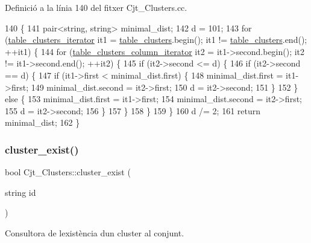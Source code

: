 Definició a la línia 140 del fitxer Cjt\+\_\+\+Clusters.\+cc.


\begin{DoxyCode}
140                                                 \{
141     pair<string, string> minimal\_dist;
142     d = 101;
143     \textcolor{keywordflow}{for} (\hyperlink{class_cjt___clusters_ac53ace59de6ecf75f90d7a4fc6e56c0e}{table\_clusters\_iterator} it1 = \hyperlink{class_cjt___clusters_a6af3fcf70683cdb88f137f6f51002939}{table\_clusters}.begin(); it1 != 
      \hyperlink{class_cjt___clusters_a6af3fcf70683cdb88f137f6f51002939}{table\_clusters}.end(); ++it1) \{
144         \textcolor{keywordflow}{for} (\hyperlink{class_cjt___clusters_abdef6142bd4683a878bb393a9095555e}{table\_clusters\_column\_iterator} it2 = it1->second.begin(); it2 !=
       it1->second.end(); ++it2) \{
145             \textcolor{keywordflow}{if} (it2->second <= d) \{
146                 \textcolor{keywordflow}{if} (it2->second == d) \{
147                     \textcolor{keywordflow}{if} (it1->first < minimal\_dist.first) \{
148                         minimal\_dist.first = it1->first;
149                         minimal\_dist.second = it2->first;
150                         d = it2->second;
151                     \}
152                 \} \textcolor{keywordflow}{else} \{
153                     minimal\_dist.first = it1->first;
154                     minimal\_dist.second = it2->first;
155                     d = it2->second;
156                 \}
157             \}              
158         \}
159     \}
160     d /= 2;
161     \textcolor{keywordflow}{return} minimal\_dist;
162 \}
\end{DoxyCode}
\mbox{\label{class_cjt___clusters_aaa57cbd8d86567b4403ac9adb34a87f5}} 
\subsubsection{\texorpdfstring{cluster\+\_\+exist()}{cluster\_exist()}}
{\footnotesize\ttfamily bool Cjt\+\_\+\+Clusters\+::cluster\+\_\+exist (\begin{DoxyParamCaption}\item[{string}]{id }\end{DoxyParamCaption})}



Consultora de l\textquotesingle{}existència d\textquotesingle{}un cluster al conjunt. 

